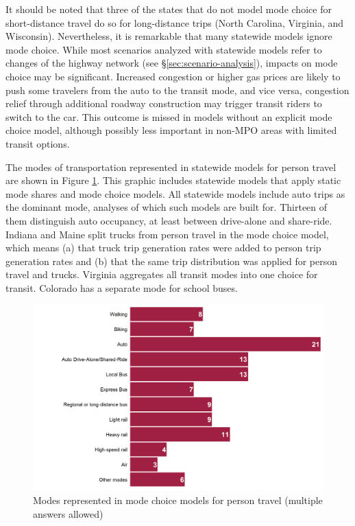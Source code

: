 It should be noted that three of the states that do not model mode choice for short-distance travel do so for long-distance trips (North Carolina, Virginia, and Wisconsin). Nevertheless, it is remarkable that many statewide models ignore mode choice. While most scenarios analyzed with statewide models refer to changes of the highway network (see \S\ref{sec:scenario-analysis}), impacts on mode choice may be significant. Increased congestion or higher gas prices are likely to push some travelers from the auto to the transit mode, and vice versa, congestion relief through additional roadway construction may trigger transit riders to switch to the car. This outcome is missed in models without an explicit mode choice model, although possibly less important in non-MPO areas with limited transit options.

The modes of transportation represented in statewide models for person travel are shown in Figure \ref{fig:person-modes-represented}. This graphic includes statewide models that apply static mode shares and mode choice models. All statewide models include auto trips as the dominant mode, analyses of which such models are built for. Thirteen of them distinguish auto occupancy, at least between drive-alone and share-ride. Indiana and Maine split trucks from person travel in the mode choice model, which means (a) that truck trip generation rates were added to person trip generation rates and (b) that the same trip distribution was applied for person travel and trucks. Virginia aggregates all transit modes into one choice for transit. Colorado has a separate mode for school buses.

\begin{figure}  %
\centering
\includegraphics[width=6.4in]{graphics/10-person-modes-represented}
\caption[Modes represented in mode choice models for person travel]{Modes represented in mode choice models for person travel (multiple answers allowed)}
\label{fig:person-modes-represented}
\end{figure}

